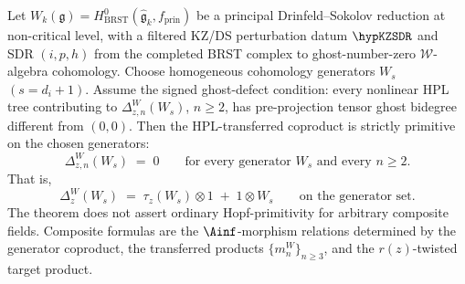 \begin{theorem}
\label{thm:gravitational-primitivity}
Let $W_k(\mathfrak{g})
= H^0_{\mathrm{BRST}}(\widehat{\mathfrak{g}}_k, f_{\mathrm{prin}})$
be a principal Drinfeld--Sokolov reduction at non-critical level,
with a filtered KZ/DS perturbation datum \(\hypKZSDR\) and SDR
$(i,p,h)$ from the completed BRST complex to ghost-number-zero
\(\mathcal W\)-algebra cohomology. Choose homogeneous cohomology
generators \(W_s\) \((s=d_i+1)\). Assume the signed ghost-defect
condition: every nonlinear HPL tree contributing to
\(\Delta_{z,n}^W(W_s)\), \(n\ge2\), has pre-projection tensor ghost
bidegree different from \((0,0)\). Then the HPL-transferred coproduct
is strictly primitive on the chosen generators:
\begin{equation}\label{eq:gravitational-primitivity}
\Delta_{z,n}^W(W_s) \;=\; 0
\qquad\text{for every generator }W_s\text{ and every }n \ge 2.
\end{equation}
That is,
\begin{equation}\label{eq:gravitational-primitivity-explicit}
\Delta_z^W(W_s) \;=\; \tau_z(W_s) \otimes 1 \;+\; 1 \otimes W_s
\qquad
\text{on the generator set}.
\end{equation}
The theorem does not assert ordinary Hopf-primitivity for arbitrary
composite fields. Composite formulas are the \(\Ainf\)-morphism
relations determined by the generator coproduct, the transferred
products \(\{m_n^W\}_{n\ge3}\), and the \(r(z)\)-twisted target
product.
\end{theorem}

